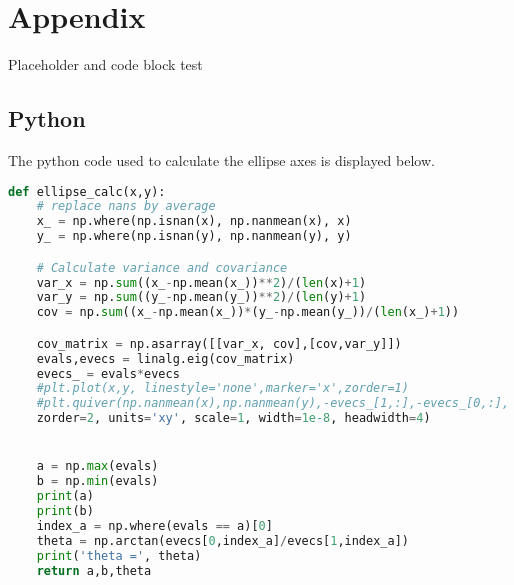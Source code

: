 \section*{Appendix}
Placeholder and code block test
\subsection*{Python}
The python code used to calculate the ellipse axes is displayed below.
\begin{lstlisting}[language=Python]
def ellipse_calc(x,y):
    # replace nans by average
    x_ = np.where(np.isnan(x), np.nanmean(x), x)
    y_ = np.where(np.isnan(y), np.nanmean(y), y)

    # Calculate variance and covariance
    var_x = np.sum((x_-np.mean(x_))**2)/(len(x)+1)
    var_y = np.sum((y_-np.mean(y_))**2)/(len(y)+1)
    cov = np.sum((x_-np.mean(x_))*(y_-np.mean(y_))/(len(x_)+1))

    cov_matrix = np.asarray([[var_x, cov],[cov,var_y]])
    evals,evecs = linalg.eig(cov_matrix)
    evecs_ = evals*evecs
    #plt.plot(x,y, linestyle='none',marker='x',zorder=1)
    #plt.quiver(np.nanmean(x),np.nanmean(y),-evecs_[1,:],-evecs_[0,:],
    zorder=2, units='xy', scale=1, width=1e-8, headwidth=4)


    a = np.max(evals)
    b = np.min(evals)
    print(a)
    print(b)
    index_a = np.where(evals == a)[0]
    theta = np.arctan(evecs[0,index_a]/evecs[1,index_a])
    print('theta =', theta)
    return a,b,theta
\end{lstlisting}






